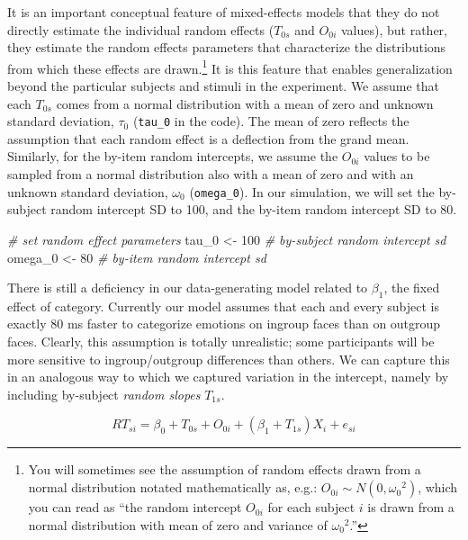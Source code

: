 \documentclass[english,doc,floatsintext]{apa6}
\newenvironment{Shaded}{\begin{snugshade}}{\end{snugshade}}
\newcommand{\CommentTok}[1]{\textcolor[rgb]{0.56,0.35,0.01}{\textit{#1}}}
\newcommand{\DecValTok}[1]{\textcolor[rgb]{0.00,0.00,0.81}{#1}}
\newcommand{\NormalTok}[1]{#1}
\newcommand{\StringTok}[1]{\textcolor[rgb]{0.31,0.60,0.02}{#1}}
\begin{document}
It is an important conceptual feature of mixed-effects models that they do not directly estimate the individual random effects (\(T_{0s}\) and \(O_{0i}\) values), but rather, they estimate the random effects parameters that characterize the distributions from which these effects are drawn.\footnote{You will sometimes see the assumption of random effects drawn from a normal distribution notated mathematically as, e.g.: $O_{0i} \sim N(0, {\omega_0}^2)$, which you can read as ``the random intercept $O_{0i}$ for each subject $i$ is drawn from a normal distribution with mean of zero and variance of ${\omega_0}^2$.''} It is this feature that enables generalization beyond the particular subjects and stimuli in the experiment. We assume that each \(T_{0s}\) comes from a normal distribution with a mean of zero and unknown standard deviation, \(\tau_0\) (\texttt{tau\_0} in the code). The mean of zero reflects the assumption that each random effect is a deflection from the grand mean. Similarly, for the by-item random intercepts, we assume the \(O_{0i}\) values to be sampled from a normal distribution also with a mean of zero and with an unknown standard deviation, \(\omega_0\) (\texttt{omega\_0}). In our simulation, we will set the by-subject random intercept SD to 100, and the by-item random intercept SD to 80.

\begin{Shaded}
\begin{Highlighting}[]
\CommentTok{# set random effect parameters}
\NormalTok{tau_}\DecValTok{0}\NormalTok{   <-}\StringTok{ }\DecValTok{100} \CommentTok{# by-subject random intercept sd}
\NormalTok{omega_}\DecValTok{0}\NormalTok{ <-}\StringTok{  }\DecValTok{80} \CommentTok{# by-item random intercept sd}
\end{Highlighting}
\end{Shaded}

There is still a deficiency in our data-generating model related to \(\beta_1\), the fixed effect of category. Currently our model assumes that each and every subject is exactly 80 ms faster to categorize emotions on ingroup faces than on outgroup faces. Clearly, this assumption is totally unrealistic; some participants will be more sensitive to ingroup/outgroup differences than others. We can capture this in an analogous way to which we captured variation in the intercept, namely by including by-subject \emph{random slopes} \(T_{1s}\).

\begin{equation}
RT_{si} = \beta_0 + T_{0s} + O_{0i} + \left(\beta_1 + T_{1s}\right) X_i + e_{si}
\end{equation}
\end{document}

